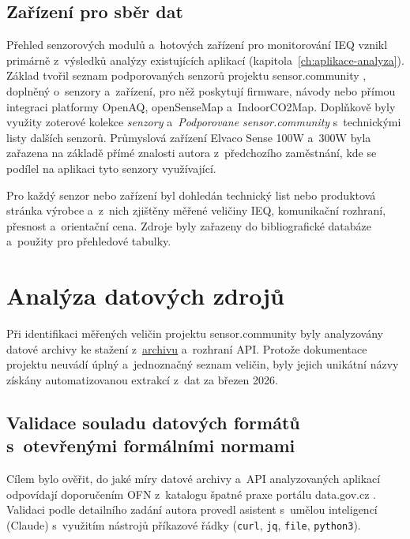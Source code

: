 \FloatBarrier
\subsection{Zařízení pro sběr dat}

Přehled senzorových modulů a~hotových zařízení pro monitorování IEQ vznikl primárně z~výsledků analýzy existujících aplikací (kapitola~\ref{ch:aplikace-analyza}). Základ tvořil seznam podporovaných senzorů projektu sensor.community \parencite{SensorCommunityDevices}, doplněný o~senzory a~zařízení, pro něž poskytují firmware, návody nebo přímou integraci platformy OpenAQ, openSenseMap a~IndoorCO2Map. Doplňkově byly využity zoterové kolekce \textit{senzory} a~\textit{Podporovane sensor.community} s~technickými listy dalších senzorů. Průmyslová zařízení Elvaco Sense 100W a~300W byla zařazena na základě přímé znalosti autora z~předchozího zaměstnání, kde se podílel na aplikaci tyto senzory využívající.

Pro každý senzor nebo zařízení byl dohledán technický list nebo produktová stránka výrobce a~z~nich zjištěny měřené veličiny IEQ, komunikační rozhraní, přesnost a~orientační cena. Zdroje byly zařazeny do bibliografické databáze a~použity pro přehledové tabulky.

\section{Analýza datových zdrojů}

Při identifikaci měřených veličin projektu sensor.community byly analyzovány datové archivy ke stažení z~\href{https://archive.sensor.community/}{archivu} a~rozhraní API. Protože dokumentace projektu neuvádí úplný a~jednoznačný seznam veličin, byly jejich unikátní názvy získány automatizovanou extrakcí z~dat za březen 2026.

\FloatBarrier
\subsection{Validace souladu datových formátů s~otevřenými formálními normami}
\label{subsec:validace-ofn}

Cílem bylo ověřit, do jaké míry datové archivy a~API analyzovaných aplikací odpovídají doporučením OFN z~katalogu špatné praxe portálu data.gov.cz \parencite{PrikladySpatnePraxe2022}. Validaci podle detailního zadání autora provedl asistent s~umělou inteligencí (Claude) s~využitím nástrojů příkazové řádky (\texttt{curl}, \texttt{jq}, \texttt{file}, \texttt{python3}).

